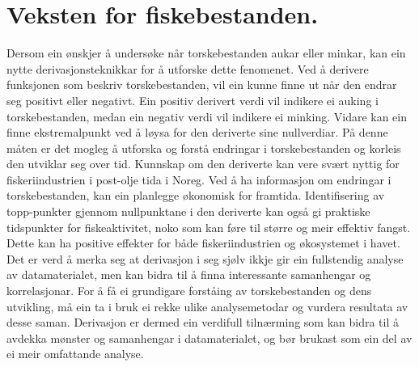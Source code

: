 \documentclass{report}
\begin{document}
\section{Veksten for fiskebestanden.}
Dersom ein ønskjer å undersøke når torskebestanden aukar eller minkar, kan ein nytte derivasjonsteknikkar for å utforske dette fenomenet.
Ved å derivere funksjonen som beskriv torskebestanden, vil ein kunne finne ut når den endrar seg positivt eller negativt.
Ein positiv derivert verdi vil indikere ei auking i torskebestanden, medan ein negativ verdi vil indikere ei minking. Vidare kan ein finne ekstremalpunkt ved å løysa for den deriverte sine nullverdiar. På denne måten er det mogleg å utforska og forstå endringar i torskebestanden og korleis den utviklar seg over tid.
Kunnskap om den deriverte kan vere svært nyttig for fiskeriindustrien i post-olje tida i Noreg. Ved å ha informasjon om endringar i torskebestanden, kan ein planlegge økonomisk for framtida. Identifisering av topp-punkter gjennom nullpunktane i den deriverte kan også gi praktiske tidspunkter for fiskeaktivitet, noko som kan føre til større og meir effektiv fangst. Dette kan ha positive effekter for både fiskeriindustrien og økosystemet i havet.
Det er verd å merka seg at derivasjon i seg sjølv ikkje gir ein fullstendig analyse av datamaterialet, men kan bidra til å finna interessante samanhengar og korrelasjonar.
For å få ei grundigare forståing av torskebestanden og dens utvikling, må ein ta i bruk ei rekke ulike analysemetodar og vurdera resultata av desse saman. Derivasjon er dermed ein verdifull tilnærming som kan bidra til å avdekka mønster og samanhengar i datamaterialet, og bør brukast som ein del av ei meir omfattande analyse.
\end{document}
